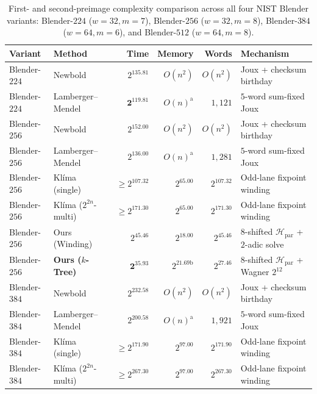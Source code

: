 \documentclass[11pt,a4paper]{article}
\theoremstyle{definition}
\theoremstyle{remark}
\newcommand{\Hpar}{\mathcal{H}_{\mathrm{par}}}
\begin{document}
\begin{table}[t]
\centering
\caption{First- and second-preimage complexity comparison across all four NIST Blender variants: Blender-$224$ ($w{=}32, m{=}7$), Blender-$256$ ($w{=}32, m{=}8$), Blender-$384$ ($w{=}64, m{=}6$), and Blender-$512$ ($w{=}64, m{=}8$).}
\label{tab:preimage-comp}
\footnotesize
\setlength{\tabcolsep}{3.4pt}
\renewcommand{\arraystretch}{1.05}
\begin{tabular}{@{}llrrrl@{}}
\toprule
\textbf{Variant} & \textbf{Method} & \textbf{Time} & \textbf{Memory} & \textbf{Words} & \textbf{Mechanism} \\
\midrule
Blender-$224$ & Newbold~\cite{New08} & $2^{135.81}$ & $O(n^2)$ & $O(n^2)$ & Joux + checksum birthday \\
Blender-$224$ & Lamberger--Mendel~\cite{Men08,LM09} & $\mathbf{2^{119.81}}$ & $O(n)^{\mathrm{a}}$ & $1{,}121$ & $5$-word sum-fixed Joux \\
\midrule
Blender-$256$ & Newbold~\cite{New08} & $2^{152.00}$ & $O(n^2)$ & $O(n^2)$ & Joux + checksum birthday \\
Blender-$256$ & Lamberger--Mendel~\cite{Men08,LM09} & $2^{136.00}$ & $O(n)^{\mathrm{a}}$ & $1{,}281$ & $5$-word sum-fixed Joux \\
Blender-$256$ & Kl\'{i}ma (single)~\cite{Kli09} & $\ge 2^{107.32}$ & $2^{65.00}$ & $2^{107.32}$ & Odd-lane fixpoint winding \\
Blender-$256$ & Kl\'{i}ma ($2^{2n}$-multi)~\cite{Kli09} & $\ge 2^{171.30}$ & $2^{65.00}$ & $2^{171.30}$ & Odd-lane fixpoint winding \\
Blender-$256$ & Ours (Winding) & $2^{45.46}$ & $2^{18.00}$ & $2^{45.46}$ & $8$-shifted $\Hpar$ + $2$-adic solve \\
Blender-$256$ & \textbf{Ours ($k$-Tree)} & $\mathbf{2^{35.93}}$ & $2^{21.69\mathrm{b}}$ & $2^{27.46}$ & $8$-shifted $\Hpar$ + Wagner $2^{12}$ \\
\midrule
Blender-$384$ & Newbold~\cite{New08} & $2^{232.58}$ & $O(n^2)$ & $O(n^2)$ & Joux + checksum birthday \\
Blender-$384$ & Lamberger--Mendel~\cite{Men08,LM09} & $2^{200.58}$ & $O(n)^{\mathrm{a}}$ & $1{,}921$ & $5$-word sum-fixed Joux \\
Blender-$384$ & Kl\'{i}ma (single)~\cite{Kli09} & $\ge 2^{171.90}$ & $2^{97.00}$ & $2^{171.90}$ & Odd-lane fixpoint winding \\
Blender-$384$ & Kl\'{i}ma ($2^{2n}$-multi)~\cite{Kli09} & $\ge 2^{267.30}$ & $2^{97.00}$ & $2^{267.30}$ & Odd-lane fixpoint winding \\

\end{tabular}
\end{table}
\end{document}
